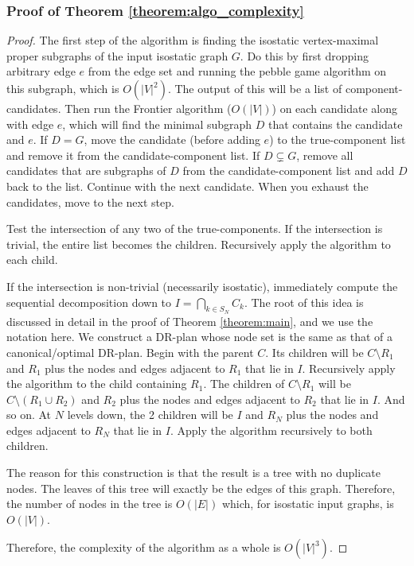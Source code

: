 \subsubsection{Proof of Theorem \ref{theorem:algo_complexity}}

\begin{proof}
The first step of the algorithm is finding the isostatic vertex-maximal proper subgraphs of the input isostatic graph $G$. Do this by first dropping arbitrary edge $e$ from the edge set and running the pebble game algorithm \cite{Jacobs:1997:PG} on this subgraph, which is $O(|V|^2)$. The output of this will be a list of component-candidates. Then run the Frontier algorithm \cite{hoffman2001decompositionII} \cite{lomonosov2004graph} ($O(|V|)$) on each candidate along with edge $e$, which will find the minimal subgraph $D$ that contains the candidate and $e$. If $D=G$, move the candidate (before adding $e$) to the true-component list and remove it from the candidate-component list. If $D\subsetneq G$, remove all candidates that are subgraphs of $D$ from the candidate-component list and add $D$ back to the list. Continue with the next candidate. When you exhaust the candidates, move to the next step.

Test the intersection of any two of the true-components. If the intersection is trivial, the entire list becomes the children. Recursively apply the algorithm to each child.

If the intersection is non-trivial (necessarily isostatic), immediately compute the sequential decomposition down to $I=\bigcap_{k\in S_N}{C_k}$. The root of this idea is discussed in detail in the proof of Theorem \ref{theorem:main}, and we use the notation here. We construct a DR-plan whose node set is the same as that of a canonical/optimal DR-plan. Begin with the parent $C$. Its children will be $C\setminus R_1$ and $R_1$ plus the nodes and edges adjacent to $R_1$ that lie in $I$. Recursively apply the algorithm to the child containing $R_1$. The children of $C\setminus R_1$ will be $C\setminus (R_1\cup R_2)$ and $R_2$ plus the nodes and edges adjacent to $R_2$ that lie in $I$. And so on. At $N$ levels down, the 2 children will be $I$ and $R_N$ plus the nodes and edges adjacent to $R_N$ that lie in $I$. Apply the algorithm recursively to both children.

The reason for this construction is that the result is a tree with no duplicate nodes. The leaves of this tree will exactly be the edges of this graph. Therefore, the number of nodes in the tree is $O(|E|)$ which, for isostatic input graphs, is $O(|V|)$.

Therefore, the complexity of the algorithm as a whole is $O(|V|^3)$.
%
\end{proof}


